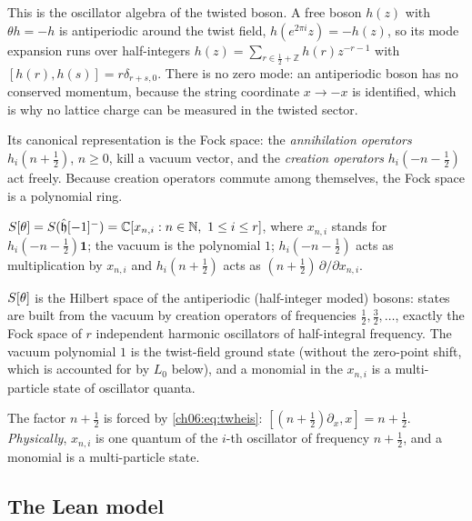 \begin{physics}
This is the oscillator algebra of the twisted boson. A free boson $h(z)$ with $\theta h=-h$ is antiperiodic around the twist field, $h(e^{2\pi i}z)=-h(z)$, so its mode expansion runs over half-integers $h(z)=\sum_{r\in\frac12+\mathbb Z}h(r)z^{-r-1}$ with $[h(r),h(s)]=r\delta_{r+s,0}$. There is no zero mode: an antiperiodic boson has no conserved momentum, because the string coordinate $x\to-x$ is identified, which is why no lattice charge can be measured in the twisted sector.
\end{physics}
Its canonical representation is the Fock space: the \emph{annihilation operators} $h_i(n+\frac12)$,
$n\ge 0$, kill a vacuum vector, and the \emph{creation operators} $h_i(-n-\frac12)$ act freely.
Because creation operators commute among themselves, the Fock space is a polynomial ring.
\begin{definition}\label{ch06:def:fockT}
$S[\theta]=S(\hat{\mathfrak h}[-1]^-)={\mathbb{C}}[x_{n,i}: n\in{\mathbb{N}},\ 1\le i\le r]$, where $x_{n,i}$ stands for
$h_i(-n-\frac12)\mathbf 1$; the vacuum is the polynomial $1$; $h_i(-n-\frac12)$ acts as
multiplication by $x_{n,i}$ and $h_i(n+\frac12)$ acts as $(n+\frac12)\,\partial/\partial x_{n,i}$.
\end{definition}

\begin{physics}
$S[\theta]$ is the Hilbert space of the antiperiodic (half-integer moded) bosons: states are built from the vacuum by creation operators of frequencies $\tfrac12,\tfrac32,\ldots$, exactly the Fock space of $r$ independent harmonic oscillators of half-integral frequency. The vacuum polynomial $1$ is the twist-field ground state (without the zero-point shift, which is accounted for by $L_0$ below), and a monomial in the $x_{n,i}$ is a multi-particle state of oscillator quanta.
\end{physics}
The factor $n+\frac12$ is forced by \eqref{ch06:eq:twheis}: $[(n+\frac12)\partial_{x},x]=n+\frac12$.
\emph{Physically}, $x_{n,i}$ is one quantum of the $i$-th oscillator of frequency $n+\frac12$, and a
monomial is a multi-particle state.

\subsection{The Lean model}

